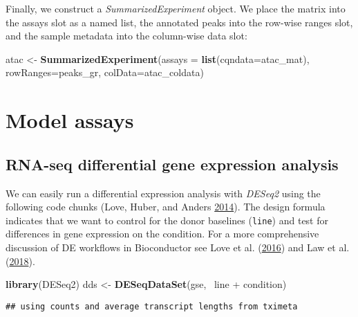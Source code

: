 \documentclass[
]{article}
\newenvironment{Shaded}{}{}
\newcommand{\DataTypeTok}[1]{\textcolor[rgb]{0.56,0.13,0.00}{#1}}
\newcommand{\KeywordTok}[1]{\textcolor[rgb]{0.00,0.44,0.13}{\textbf{#1}}}
\newcommand{\NormalTok}[1]{#1}
\newcommand{\OperatorTok}[1]{\textcolor[rgb]{0.40,0.40,0.40}{#1}}
\newcommand{\StringTok}[1]{\textcolor[rgb]{0.25,0.44,0.63}{#1}}
\begin{document}
Finally, we construct a \emph{SummarizedExperiment} object. We place the matrix
into the assays slot as a named list, the annotated peaks into the row-wise
ranges slot, and the sample metadata into the column-wise data slot:

\begin{Shaded}
\begin{Highlighting}[]
\NormalTok{atac <-}\StringTok{ }\KeywordTok{SummarizedExperiment}\NormalTok{(}\DataTypeTok{assays =} \KeywordTok{list}\NormalTok{(}\DataTypeTok{cqndata=}\NormalTok{atac_mat),}
                             \DataTypeTok{rowRanges=}\NormalTok{peaks_gr,}
                             \DataTypeTok{colData=}\NormalTok{atac_coldata)}
\end{Highlighting}
\end{Shaded}

\hypertarget{model-assays}{%
\section{Model assays}\label{model-assays}}

\hypertarget{rna-seq-differential-gene-expression-analysis}{%
\subsection{RNA-seq differential gene expression analysis}\label{rna-seq-differential-gene-expression-analysis}}

We can easily run a differential expression analysis with \emph{DESeq2} using the
following code chunks (Love, Huber, and Anders \protect\hyperlink{ref-Love2014}{2014}). The design formula indicates that we want to
control for the donor baselines (\texttt{line}) and test for differences in gene
expression on the condition. For a more comprehensive discussion of DE
workflows in Bioconductor see Love et al. (\protect\hyperlink{ref-Love2016-f1000}{2016}) and Law et al. (\protect\hyperlink{ref-Law2018-f1000}{2018}).

\begin{Shaded}
\begin{Highlighting}[]
\KeywordTok{library}\NormalTok{(DESeq2)}
\NormalTok{dds <-}\StringTok{ }\KeywordTok{DESeqDataSet}\NormalTok{(gse, }\OperatorTok{~}\NormalTok{line }\OperatorTok{+}\StringTok{ }\NormalTok{condition)}
\end{Highlighting}
\end{Shaded}

\begin{verbatim}
## using counts and average transcript lengths from tximeta
\end{verbatim}
\end{document}
